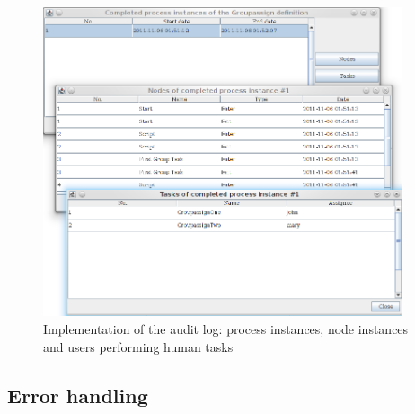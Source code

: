 \begin{figure}[H]
\centering
\includegraphics[width=400px,keepaspectratio]{implementation-auditlog.png}
\caption{Implementation of the audit log: process instances, node instances and users performing human tasks}
\label{fig:implementation-auditlog}
\end{figure}

\subsection{Error handling}
